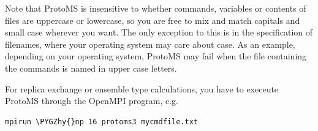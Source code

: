 \documentclass[letterpaper,10pt,english]{sphinxmanual}
\def\PYGZhy{\char`\-}
\begin{document}
Note that ProtoMS is insensitive to whether commands, variables or contents of files are uppercase or lowercase, so you are free to mix and match capitals and small case wherever you want. The only exception to this is in the specification of filenames, where your operating system may care about case. As an example, depending on your operating system, ProtoMS may fail when the file containing the commands is named in upper case letters.

For replica exchange or ensemble type calculations, you have to execeute ProtoMS through the OpenMPI program, e.g.

\begin{Verbatim}[commandchars=\\\{\}]
mpirun \PYGZhy{}np 16 protoms3 mycmdfile.txt
\end{Verbatim}

\end{document}
